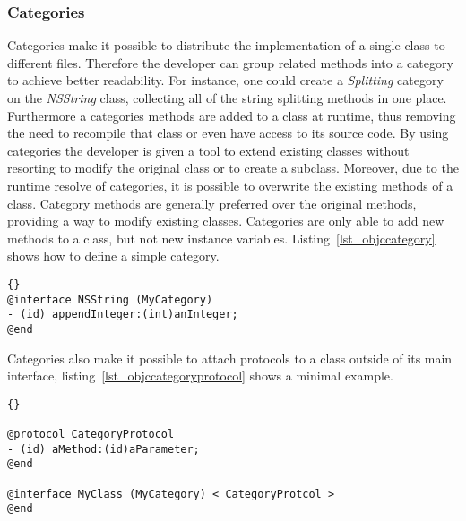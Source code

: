 \subsubsection{Categories}
Categories make it possible to distribute the implementation of a single class
to different files. Therefore the developer can group related methods into a
category to achieve better readability. For instance, one could create a
\textit{Splitting} category on the \textit{NSString} class, collecting all of
the string splitting methods in one place.
Furthermore a categories methods are added to a class at runtime, thus
removing the need to recompile that class or even have access to its source
code. By using categories the developer is given a tool to extend existing
classes without resorting to modify the original class or to create a subclass.
Moreover, due to the runtime resolve of categories, it is possible to overwrite
the existing methods of a class. Category methods are generally preferred over
the original methods, providing a way to modify existing classes. Categories are
only able to add new methods to a class, but not new instance variables.
Listing~\ref{lst_objccategory} shows how to define a simple category.

\begin{lstlisting}[captionpos=b, caption=An Objective-C category added to the
NSString class., label=lst_objccategory]{}
@interface NSString (MyCategory)
- (id) appendInteger:(int)anInteger;
@end
\end{lstlisting}

Categories also make it possible to attach protocols to a class outside of its
main interface, listing~\ref{lst_objccategoryprotocol} shows a minimal example.

\begin{lstlisting}[captionpos=b, caption=Attaching a protocol to an existing
class by the means of a category., label=lst_objccategoryprotocol]{}

@protocol CategoryProtocol
- (id) aMethod:(id)aParameter;
@end

@interface MyClass (MyCategory) < CategoryProtcol >
@end

\end{lstlisting}

